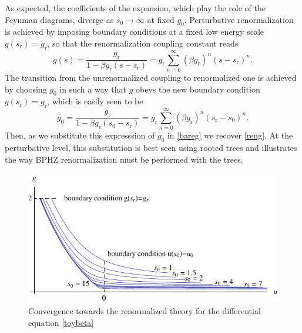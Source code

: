 \documentclass[12pt,here,feynmf]{article}
\begin{document}
As expected, the coefficients of the expansion, which play the role of the Feynman diagrams,  diverge as $s_{0}\rightarrow\infty$ at fixed $g_{0}$. Perturbative renormalization is achieved by imposing boundary conditions at a fixed low energy scale $g(s_{\mathrm{r}})=g_{\mathrm{r}}$, so that the renormalization coupling constant reads
 \begin{equation}
g(s)=\frac{g_{\mathrm{r}}}{1-\beta g_{\mathrm{r}}(s-s_{\mathrm{r}})}=g_{\mathrm{r}}\sum_{n=0}^{\infty}(\beta g_{\mathrm{r}})^{n}(s-s_{\mathrm{r}})^{n}.
\label{reng}
\end{equation}
The transition from the unrenormalized coupling to renormalized one is achieved by choosing $g_{0}$ in such a way that $g$ obeys the new boundary condition $g(s_{\mathrm{r}})=g_{\mathrm{r}}$, which is easily seen to be
 \begin{equation}
g_{0}=\frac{g_{\mathrm{r}}}{1-\beta g_{\mathrm{r}}(s_{0}-s_{\mathrm{r}})}=g_{\mathrm{r}}\sum_{n=0}^{\infty}(\beta g_{\mathrm{r}})^{n}(s_{\mathrm{r}}-s_{0})^{n}.
\end{equation}
Then, as we substitute this expresssion of $g_{0}$ in \eqref{bareg} we recover \eqref{reng}. At the perturbative level, this substitution is best seen using rooted trees and illustrates the way BPHZ renormalization must be performed with the trees. 


\begin{figure}
\begin{center}
\includegraphics[width=12cm]{flow.pdf}
\caption{Convergence towards the renormalized theory  for the differential equation \eqref{toybeta}}
\end{center}
\end{figure}
\end{document}
